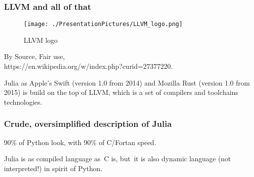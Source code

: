 \documentclass[10pt,t]{beamer}
\begin{document}
\begin{frame}
  \frametitle{LLVM and all of that}


  \begin{figure}

    \texttt{[image: ./PresentationPictures/LLVM\_logo.png]}


    \caption{LLVM logo}

  \end{figure}


  By Source, Fair use, \\
  {https://en.wikipedia.org/w/index.php?curid=27377220}.


  Julia as Apple's Swift (version 1.0 from 2014) and Mozilla Rust
  (version 1.0 from 2015) is build on the top of LLVM, which is a set
  of compilers and toolchains technologies.

\end{frame}




\begin{frame}
  \frametitle{Crude, oversimplified description of Julia}


  \begingroup

  \large

  90\% of Python look, with 90\% of C/Fortan speed.

  \vspace{1em}


  Julia is as compiled language as~C is, but~it is also dynamic
  language (not interpreted!) in spirit of Python.

  \endgroup

\end{frame}
\end{document}
